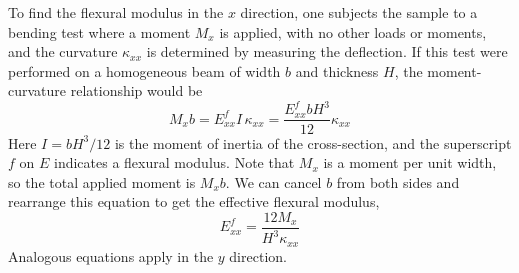 \documentclass[11pt]{article}
\begin{document}
To find the flexural modulus in the $x$ direction, one subjects the sample to a bending test where a moment $M_x$ is applied, with no other loads or moments, and the curvature $\kappa_{xx}$ is determined by measuring the deflection.  If this test were performed on a homogeneous beam of width $b$ and thickness $H$, the moment-curvature relationship would be
\begin{equation}
   M_x b = E^f_{xx} I \, \kappa_{xx} = \frac{E^f_{xx} b H^3}{12} \kappa_{xx}
   \label{momentCurvature}
\end{equation}
Here $I = bH^3/12$ is the moment of inertia of the cross-section, and the superscript $f$ on $E$ indicates a flexural modulus.  Note that $M_x$ is a moment per unit width, so the total applied moment is $M_x b$.  We can cancel $b$ from both sides and rearrange this equation to get the effective flexural modulus,
\begin{equation}
   E^f_{xx} = \frac{12 M_x}{H^3 \kappa_{xx}}
   \label{EflexDef}
\end{equation}
Analogous equations apply in the $y$ direction.  
\end{document}
